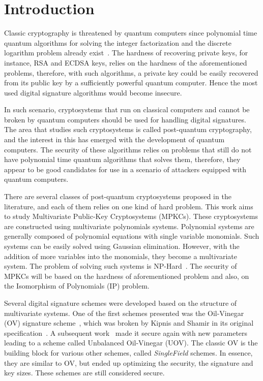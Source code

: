 \documentclass{ufsctex/ufsctex}
\makeatletter
\renewcommand{\listadeabreviaturas}{
	\pretextualchapter{List of Acronyms}\@starttoc{las}}
\renewcommand{\listadesimbolos}{
	\pretextualchapter{List of Symbols}\@starttoc{lsb}}
\renewcommand{\listadealgoritmos}{
	\pretextualchapter{List of Algorithms}\@starttoc{loa}}
\makeatother
\begin{document}
\capa{}
\pretextuais{}
\listadefiguras{}
\listadeabreviaturas{}
\sumario{}

\chapter{Introduction}

Classic cryptography is threatened by quantum computers since polynomial time
quantum algorithms for solving the integer factorization and the discrete
logarithm problem already exist~\cite{shor1999polynomial}. The hardness of
recovering private keys, for instance, RSA
and ECDSA keys, relies
on the hardness of the aforementioned problems, therefore, with such
algorithms, a private key could be easily recovered from its public key by a
sufficiently powerful quantum computer. Hence the most used digital signature
algorithms would become insecure.

In such scenario, cryptosystems that run on classical computers and cannot be
broken by quantum computers should be used for handling digital signatures. The
area that studies such cryptosystems is called post-quantum cryptography, and
the interest in this has emerged with the development of quantum computers. The
security of these algorithms relies on problems that still do not have
polynomial time quantum algorithms that solves them, therefore, they appear to
be good candidates for use in a scenario of attackers equipped with quantum
computers.

There are several classes of post-quantum cryptosystems proposed in the
literature, and each of them relies on one kind of hard problem. This work aims
to study Multivariate Public-Key Cryptosystems
(MPKCs). These
cryptosystems are constructed using multivariate polynomials systems.
Polynomial systems are generally composed of polynomial equations with single
variable monomials. Such systems can be easily solved using Gaussian
elimination. However, with the addition of more variables into the monomials,
they become a multivariate system. The problem of solving such systems is
NP-Hard~\cite{garey1990npc}. The security of MPKCs will be based on the
hardness of aforementioned problem and also, on the Isomorphism of Polynomials
(IP) problem.

Several digital signature schemes were developed based on the structure of
multivariate systems. One of the first schemes presented was the Oil-Vinegar
(OV) signature scheme~\cite{patarin1997ov}, which
was broken by Kipnis and Shamir in its original
specification~\cite{kipnis1998cryptanalysis}. A subsequent
work~\cite{kipnis1999unbalanced} made it secure again with new parameters
leading to a scheme called Unbalanced Oil-Vinegar (UOV). The classic OV is the building block for various other
schemes, called \textit{SingleField} schemes. In essence, they are similar to
OV, but ended up optimizing the security, the signature and key sizes. These
schemes are still considered secure.
\end{document}
